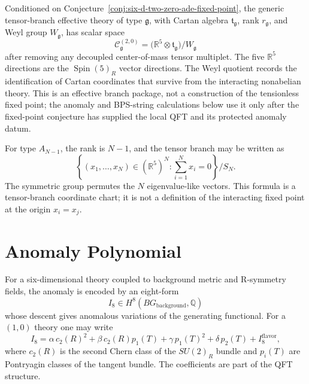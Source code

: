 \begin{hypothesis}
\label{hyp:six-d-two-zero-tensor-branch-eft}
Conditioned on
Conjecture~\ref{conj:six-d-two-zero-ade-fixed-point}, the generic
tensor-branch effective theory of type \(\mathfrak g\), with Cartan algebra
\(\mathfrak t_{\mathfrak g}\), rank \(r_{\mathfrak g}\), and Weyl group
\(W_{\mathfrak g}\), has scalar space
\[
  \mathcal C_{\mathfrak g}^{(2,0)}
  =
  \bigl(\mathbb R^5\otimes\mathfrak t_{\mathfrak g}\bigr)/W_{\mathfrak g}
\]
after removing any decoupled center-of-mass tensor multiplet.  The five
\(\mathbb R^5\) directions are the \(\operatorname{Spin}(5)_R\) vector
directions.  The Weyl quotient records the identification of Cartan
coordinates that survive from the interacting nonabelian theory.  This is an
effective branch package, not a construction of the tensionless fixed point;
the anomaly and BPS-string calculations below use it only after the fixed-point
conjecture has supplied the local QFT and its protected anomaly datum.
\end{hypothesis}

\begin{example}
\label{ex:six-d-a-type-tensor-branch}
For type \(A_{N-1}\), the rank is \(N-1\), and the tensor branch may be
written as
\[
  \left\{
    (x_1,\ldots,x_N)\in(\mathbb R^5)^N:
    \sum_{i=1}^N x_i=0
  \right\}/S_N .
\]
The symmetric group permutes the \(N\) eigenvalue-like vectors.  This formula
is a tensor-branch coordinate chart; it is not a definition of the
interacting fixed point at the origin \(x_i=x_j\).
\end{example}

\section{Anomaly Polynomial}

For a six-dimensional theory coupled to background metric and R-symmetry
fields, the anomaly is encoded by an eight-form
\[
  I_8
  \in
  H^8(BG_{\mathrm{background}},\mathbb Q)
\]
whose descent gives anomalous variations of the generating functional.  For a
\((1,0)\) theory one may write
\[
  I_8
  =
  \alpha\,c_2(R)^2
  +
  \beta\,c_2(R)p_1(T)
  +
  \gamma\,p_1(T)^2
  +
  \delta\,p_2(T)
  +
  I_8^{\mathrm{flavor}},
\]
where \(c_2(R)\) is the second Chern class of the \(SU(2)_R\) bundle and
\(p_i(T)\) are Pontryagin classes of the tangent bundle.  The coefficients
are part of the QFT structure.

